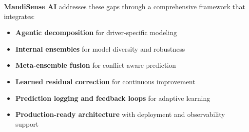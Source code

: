 \documentclass[12pt,a4paper]{report}
\begin{document}
\noindent
\textbf{MandiSense AI} addresses these gaps through a comprehensive framework that integrates:
\begin{itemize}
    \item \textbf{Agentic decomposition} for driver-specific modeling
    \item \textbf{Internal ensembles} for model diversity and robustness
    \item \textbf{Meta-ensemble fusion} for conflict-aware prediction
    \item \textbf{Learned residual correction} for continuous improvement
    \item \textbf{Prediction logging and feedback loops} for adaptive learning
    \item \textbf{Production-ready architecture} with deployment and observability support
\end{itemize}
\end{document}
